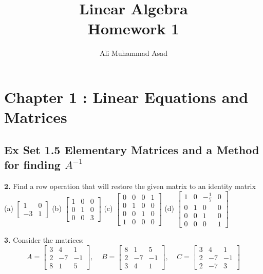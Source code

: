 \documentclass[addpoints]{exam}
\title{Linear Algebra\\ Homework 1}
\author{Ali Muhammad Asad}
\begin{document}
\maketitle
\section*{\textbf{Chapter 1 : Linear Equations and Matrices}}
\subsection*{\textbf{Ex Set 1.5 Elementary Matrices and a Method for finding $ A^{-1} $}}
\begin{questions}
    \question
    \textbf{2. } Find a row operation that will restore the given matrix to an identity matrix \\
    (a) $ \begin{bmatrix}
        1 & 0 \\ -3 & 1
    \end{bmatrix} $ \hspace{5mm} (b) $ \begin{bmatrix}
        1 & 0 & 0 \\ 0 & 1 & 0 \\ 0 & 0 & 3
    \end{bmatrix} $ \hspace{5mm} (c) $ \begin{bmatrix}
        0 & 0 & 0 & 1 \\ 0 & 1 & 0 & 0 \\ 0 & 0 & 1 & 0 \\ 1 & 0 & 0 & 0
    \end{bmatrix} $ \hspace{5mm} (d) $ \begin{bmatrix}
        1 & 0 & -\frac{1}{7} & 0 \\ 0 & 1 & 0 & 0 \\ 0 & 0 & 1 & 0 \\ 0 & 0 & 0 & 1
    \end{bmatrix} $ 
    \begin{solution}
        
    \end{solution}

    \textbf{3. } Consider the matrices: 
    $$ A = \begin{bmatrix}
        3 & 4 & 1 \\ 2 & -7 & -1 \\ 8 & 1 & 5
    \end{bmatrix}, \;\;\;\; B = \begin{bmatrix}
        8 & 1 & 5 \\ 2 & -7 & -1 \\ 3 & 4 & 1 
    \end{bmatrix}, \;\;\;\; C = \begin{bmatrix}
        3 & 4 & 1 \\ 2 & -7 & -1 \\ 2 & -7 & 3
    \end{bmatrix} $$


\end{questions}
\end{document}
